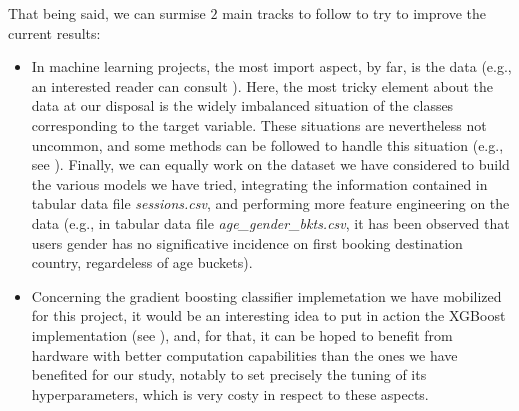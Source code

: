 \documentclass[twocolumn, switch]{article}
\begin{document}
That being said, we can surmise $2$ main tracks to follow to try to improve the current results:
\begin{itemize}
\item In machine learning projects, the most import aspect, by far, is the data (e.g., an interested reader can consult \cite{Halevy_2009}). Here, the most tricky element about the data at our disposal is the widely imbalanced situation of the classes corresponding to the target variable. These situations are nevertheless not uncommon, and some methods can be followed to handle this situation (e.g., see \cite{Chawla_2002}). Finally, we can equally work on the dataset we have considered to build the various models we have tried, integrating the information contained in tabular data file \textit{sessions.csv}, and performing more feature engineering on the data (e.g., in tabular data file \textit{age\_gender\_bkts.csv}, it has been observed that users gender has no significative incidence on first booking destination country, regardeless of age buckets).
\item Concerning the gradient boosting classifier implemetation we have mobilized for this project, it would be an interesting idea to put in action the XGBoost implementation (see \cite{Chen_2016}), and, for that, it can be hoped to benefit from hardware with better computation capabilities than the ones we have benefited for our study, notably to set precisely the tuning of its hyperparameters, which is very costy in respect to these aspects.
\end{itemize}



\begin{normalsize}

\end{normalsize}


\end{document}
